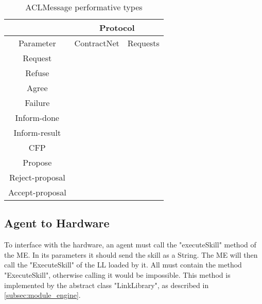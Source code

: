 \begin{table}[h!]
	\centering
	\caption{ACLMessage performative types}
	\begin{tabular}{c|cc|}
		\cline{2-3}
		\multicolumn{1}{l|}{}                 & \multicolumn{2}{c|}{Protocol}               \\ \hline
		\multicolumn{1}{|c|}{Parameter}       & \multicolumn{1}{c|}{ContractNet} 			& Requests 		\\ \hline
		\multicolumn{1}{|c|}{Request}         & \multicolumn{1}{c|}{}            			& \checkmark    \\ \hline
		\multicolumn{1}{|c|}{Refuse}          & \multicolumn{1}{c|}{\checkmark}          	& \checkmark    \\ \hline
		\multicolumn{1}{|c|}{Agree}           & \multicolumn{1}{c|}{}            			& \checkmark    \\ \hline
		\multicolumn{1}{|c|}{Failure}         & \multicolumn{1}{c|}{\checkmark}           	& \checkmark    \\ \hline
		\multicolumn{1}{|c|}{Inform-done}     & \multicolumn{1}{c|}{\checkmark}          	& \checkmark    \\ \hline
		\multicolumn{1}{|c|}{Inform-result}   & \multicolumn{1}{c|}{\checkmark}           	& \checkmark    \\ \hline
		\multicolumn{1}{|c|}{CFP}             & \multicolumn{1}{c|}{\checkmark}           	&          		\\ \hline
		\multicolumn{1}{|c|}{Propose}         & \multicolumn{1}{c|}{\checkmark}           	&          		\\ \hline
		\multicolumn{1}{|c|}{Reject-proposal} & \multicolumn{1}{c|}{\checkmark}           	&          		\\ \hline
		\multicolumn{1}{|c|}{Accept-proposal} & \multicolumn{1}{c|}{\checkmark}           	&          		\\ \hline
	\end{tabular}
	\label{tb:aclmessage_performative_types}
\end{table}

\subsection{Agent to Hardware}
\label{subsec:agent_to_hardware_interface}

To interface with the hardware, an agent must call the "executeSkill" method of the \acrlong{ME}. In its parameters it should send the skill as a String. The \acrshort{ME} will then call the "ExecuteSkill" of the \acrshort{LL} loaded by it. All  must contain the method "ExecuteSkill", otherwise calling it would be impossible. This method is implemented by the abstract class "LinkLibrary", as described in \ref{subsec:module_engine}.

